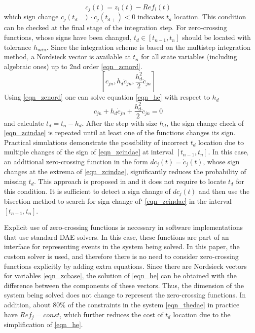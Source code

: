 \documentclass[lettersize,journal]{IEEEtran}
\begin{document}
\begin{equation}
	\label{eqn_zcindae}
	c_j(t)=z_i(t)-Ref_i(t)
\end{equation}
\noindent which sign change \(c_j(t_{d-}) \cdot c_j(t_{d+}) < 0 \) indicates \(t_d\) location. This condition can be checked at the final stage of the integration step.
For zero-crossing functions, whose signs have been changed, \(t_d \in [t_{n-1}, t_n]\) should be located with tolerance \(h_{min}\). Since the integration scheme is based on the multistep integration method, a Nordsieck vector is available at \(t_n\) for all state variables (including algebraic ones) up to 2nd order \eqref{eqn_zcnord}.
\begin{equation}
	\label{eqn_zcnord}
	\left[ c_{jn}, h_d\dot{c}_{jn}, \frac{h_d^2}{2}\ddot{c}_{jn}\right]
\end{equation}
Using \eqref{eqn_zcnord} one can solve equation \eqref{eqn_he} with respect to \(h_d\)
\begin{equation}
	\label{eqn_he}
	c_{jn}+h_d\dot{c}_{jn}+\frac{h_d^2}{2}\ddot{c}_{jn} = 0
\end{equation}
\noindent and calculate \(t_d = t_n - h_d\). After the step with size \(h_d\), the sign change check of \eqref{eqn_zcindae}  is repeated until at least one of the functions changes its sign.
Practical simulations demonstrate the possibility of incorrect \(t_d\) location due to multiple changes of the sign of \eqref{eqn_zcindae} at interval \(\left[t_{n-1},t_n\right]\). In this case, an additional zero-crossing function in the form \(dc_j(t)=\dot{c}_j(t)\), whose sign changes at the extrema of \eqref{eqn_zcindae}, significantly reduces the probability of missing \(t_d\). This approach is proposed in \cite{cellier06} and it does not require to locate \(t_d\) for this condition. It is sufficient to detect a sign change of \(dc_j(t)\) and then use the bisection method to search for sign change of` \eqref{eqn_zcindae} in the interval \(\left[t_{n-1},t_n\right]\).

Explicit use of zero-crossing functions is necessary in software implementations that use standard DAE solvers. In this case, these functions are part of an interface for representing events in the system being solved. In this paper, the custom solver is used, and therefore there is no need to consider zero-crossing functions explicitly by adding extra equations. Since there are Nordsieck vectors for variables \eqref{eqn_zcbase}, the solution of \eqref{eqn_he} can be obtained with the difference between the components of these vectors. Thus, the dimension of the system being solved does not change to represent the zero-crossing functions. In addition, about 80\% of the constraints in the system \eqref{eqn_thedae} in practice have \(Ref_j=const\), which further reduces the cost of \(t_d\) location due to the simplification of \eqref{eqn_he}.
\end{document}
